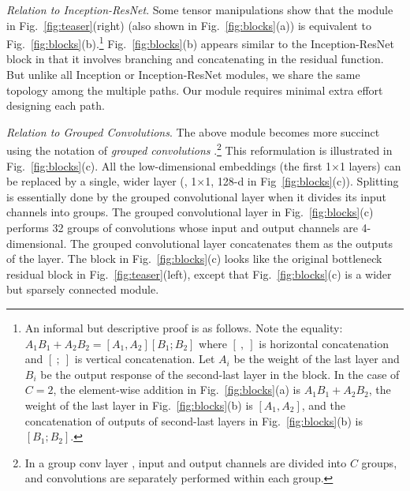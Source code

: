 \documentclass[10pt,twocolumn,letterpaper]{article}
\begin{document}
\vspace{.5em}
\noindent\emph{Relation to Inception-ResNet}. Some tensor manipulations show that the module in Fig.~\ref{fig:teaser}(right) (also shown in Fig.~\ref{fig:blocks}(a)) is equivalent to Fig.~\ref{fig:blocks}(b).\footnote{An informal but descriptive proof is as follows. Note the equality: $A_1B_1+A_2B_2 = [A_1, A_2] [B_1; B_2]
$ where $[~, ~]$ is horizontal concatenation and $[~; ~]$ is vertical concatenation. Let $A_i$ be the weight of the last layer and $B_i$ be the output response of the second-last layer in the block. In the case of $C=2$, the element-wise addition in Fig.~\ref{fig:blocks}(a) is $A_1B_1+A_2B_2$, the weight of the last layer in Fig.~\ref{fig:blocks}(b) is $[A_1, A_2]$, and the concatenation of outputs of second-last layers in Fig.~\ref{fig:blocks}(b) is $[B_1; B_2]$.}
Fig.~\ref{fig:blocks}(b) appears similar to the Inception-ResNet \cite{Szegedy2016} block in that it involves branching and concatenating in the residual function. But unlike all Inception or Inception-ResNet modules, we share the same topology among the multiple paths. Our module requires minimal extra effort designing each path.

\vspace{.5em}
\noindent\emph{Relation to Grouped Convolutions}. The above module becomes more succinct using the notation of \emph{grouped convolutions} \cite{Krizhevsky2012}.\footnote{In a group conv layer \cite{Krizhevsky2012}, input and output channels are divided into $C$ groups, and convolutions are separately performed within each group.} This reformulation is illustrated in Fig.~\ref{fig:blocks}(c).
All the low-dimensional embeddings (the first 1$\times$1 layers) can be replaced by a single, wider layer (\eg, 1$\times$1, 128-d in Fig~\ref{fig:blocks}(c)). 
Splitting is essentially done by the grouped convolutional layer when it divides its input channels into groups.
The grouped convolutional layer in Fig.~\ref{fig:blocks}(c) performs 32 groups of convolutions whose input and output channels are 4-dimensional. The grouped convolutional layer concatenates them as the outputs of the layer.
The block in Fig.~\ref{fig:blocks}(c) looks like the original bottleneck residual block in Fig.~\ref{fig:teaser}(left), except that Fig.~\ref{fig:blocks}(c) is a wider but sparsely connected module.
\end{document}
